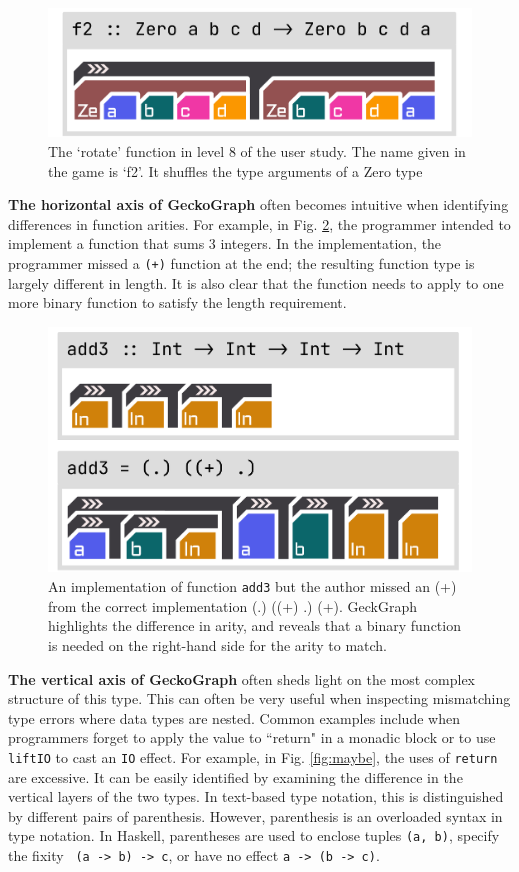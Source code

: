 \begin{figure}[hbt]
  \includegraphics[width=0.6\linewidth]{figures/rotate}
  \caption[The `rotate' function in level 8 of the user study depicted in GeckoGraph]{\label{fig:rotate} The `rotate' function in level 8 of the user study. The name given in the game is `f2'. It shuffles the type arguments of a Zero type}
\end{figure}


\textbf{The horizontal axis of GeckoGraph} often becomes intuitive when identifying differences in function arities. For example, in Fig. \ref{fig:add3}, the programmer intended to implement a function that sums 3 integers. In the implementation, the programmer missed a \texttt{(+)} function at the end; the resulting function type is largely different in length. It is also clear that the function needs to apply to one more binary function to satisfy the length requirement.  

\begin{figure}[hbt]
  \includegraphics[width=0.6\linewidth]{figures/Add3}
  \caption[An implementation of function \texttt{add3} depicted in GeckoGraph]{\label{fig:add3} An implementation of function \texttt{add3} but the author missed an (+) from the correct implementation (.) ((+) .) (+). GeckGraph highlights the difference in arity, and reveals that a binary function is needed on the right-hand side for the arity to match. }
\end{figure}


\textbf{The vertical axis of GeckoGraph} often sheds light on the most complex structure of this type. This can often be very useful when inspecting mismatching type errors where data types are nested. Common examples include when programmers forget to apply the value to ``return" in a monadic block or to use \texttt{liftIO} to cast an \texttt{IO} effect. For example, in Fig. \ref{fig:maybe}, the uses of \texttt{return} are excessive. It can be easily identified by examining the difference in the vertical layers of the two types. In text-based type notation, this is distinguished by different pairs of parenthesis. However, parenthesis is an overloaded syntax in type notation. In Haskell, parentheses are used to enclose tuples \texttt{(a, b)}, specify the fixity \texttt{ (a -> b) -> c}, or have no effect \texttt{a -> (b -> c)}.


